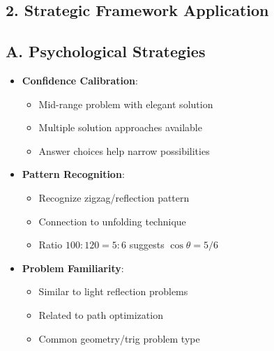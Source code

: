 \documentclass[11pt]{article}
\begin{document}
\begin{strategybox}
\section*{2. Strategic Framework Application}

\subsection*{A. Psychological Strategies}
\begin{itemize}[leftmargin=*]
    \item \textbf{Confidence Calibration}: 
    \begin{itemize}
        \item Mid-range problem with elegant solution
        \item Multiple solution approaches available
        \item Answer choices help narrow possibilities
    \end{itemize}
    \item \textbf{Pattern Recognition}:
    \begin{itemize}
        \item Recognize zigzag/reflection pattern
        \item Connection to unfolding technique
        \item Ratio $100:120 = 5:6$ suggests $\cos\theta = 5/6$
    \end{itemize}
    \item \textbf{Problem Familiarity}:
    \begin{itemize}
        \item Similar to light reflection problems
        \item Related to path optimization
        \item Common geometry/trig problem type
    \end{itemize}
\end{itemize}


\end{strategybox}
\end{document}
